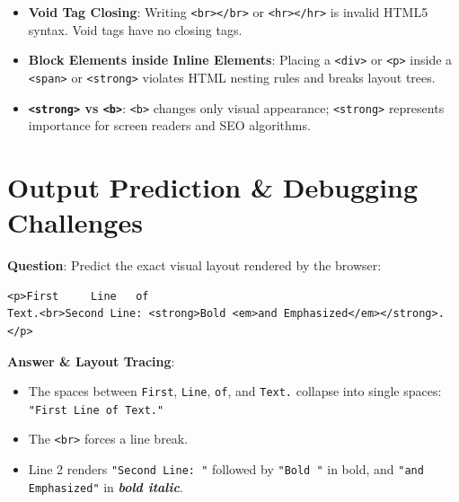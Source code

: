 \begin{examtip}
\begin{itemize}[leftmargin=1.5em]
    \item \textbf{Void Tag Closing}: Writing \texttt{<br></br>} or \texttt{<hr></hr>} is invalid HTML5 syntax. Void tags have no closing tags.
    \item \textbf{Block Elements inside Inline Elements}: Placing a \texttt{<div>} or \texttt{<p>} inside a \texttt{<span>} or \texttt{<strong>} violates HTML nesting rules and breaks layout trees.
    \item \textbf{\texttt{<strong>} vs \texttt{<b>}}: \texttt{<b>} changes only visual appearance; \texttt{<strong>} represents importance for screen readers and SEO algorithms.
\end{itemize}
\end{examtip}

\section{Output Prediction \& Debugging Challenges}

\begin{outputprediction}
\textbf{Question}: Predict the exact visual layout rendered by the browser:
\begin{lstlisting}[language=HTML5]
<p>First     Line   of
Text.<br>Second Line: <strong>Bold <em>and Emphasized</em></strong>.</p>
\end{lstlisting}
\textbf{Answer \& Layout Tracing}:
\begin{itemize}
    \item The spaces between \texttt{First}, \texttt{Line}, \texttt{of}, and \texttt{Text.} collapse into single spaces: \texttt{"First Line of Text."}
    \item The \texttt{<br>} forces a line break.
    \item Line 2 renders \texttt{"Second Line: "} followed by \texttt{"Bold "} in bold, and \texttt{"and Emphasized"} in \textbf{\textit{bold italic}}.
\end{itemize}
\end{outputprediction}

